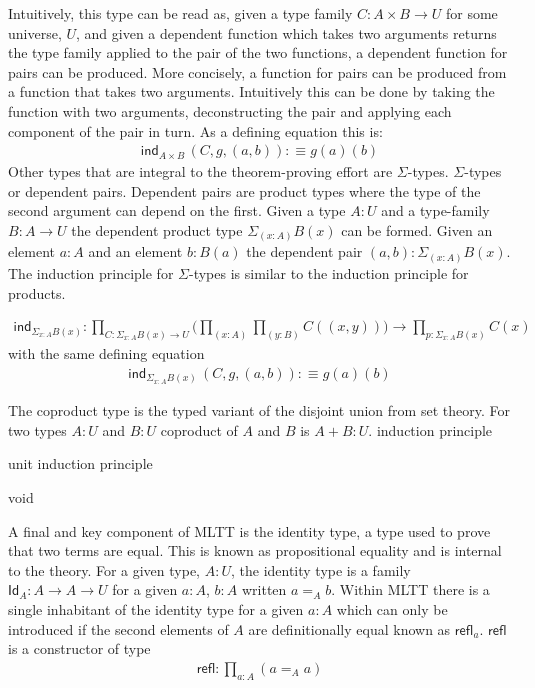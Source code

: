Intuitively, this type can be read as, given a type family $C : A \times B
\rightarrow U$ for some universe, $U$, and given a dependent function which
takes two arguments returns the type family applied to the pair of the two
functions, a dependent function for pairs can be produced. More concisely, a
function for pairs can be produced from a function that takes two arguments.
Intuitively this can be done by taking the function with two arguments,
deconstructing the pair and applying each component of the pair in turn. As a
defining equation this is:
\begin{align*}
    \textsf{ind}_{A \times B}\, (C, g, (a , b)) :\equiv g(a)(b)
\end{align*}
Other types that are integral to the theorem-proving effort are $\Sigma$-types.
$\Sigma$-types or dependent pairs. Dependent pairs are product types where the
type of the second argument can depend on the first. Given a type $A : U$ and a
type-family $B : A \rightarrow U$ the dependent product type $\Sigma_{(x :
A)}B(x)$ can be formed. Given an element $a : A$ and an element $b : B(a)$ the
dependent pair $(a,b) : \Sigma_{(x : A)}B(x)$. The induction principle for
$\Sigma$-types is similar to the induction principle for products.

\begin{align*}
    \textsf{ind}_{\Sigma_{x :A}B(x)} : \prod_{C : \Sigma_{x : A }B(x)\rightarrow
    U}\bigg(\prod_{(x : A)}\prod_{(y : B)}C((x , y))\bigg) \rightarrow \prod_{p :
    \Sigma_{x : A}B(x)}C(x)
\end{align*}
with the same defining equation
\begin{align*}
    \textsf{ind}_{\Sigma_{x :A}B(x)}\, (C, g, (a , b)) :\equiv g(a)(b)
\end{align*}


The coproduct type is the typed variant of the disjoint union from set theory.
For two types $A : U$ and $B : U$ coproduct of $A$ and $B$ is $A + B : U$.
induction principle

unit
induction principle

void

A final and key component of MLTT is the identity type, a type used to prove
that two terms are equal. This is known as propositional equality and is
internal to the theory. For a given type, $A : U$, the identity type is a family
$\textsf{Id}_{A} : A \rightarrow A \rightarrow U$ for a given $a : A$, $b : A$
written $a =_{A} b$. Within MLTT there is a single inhabitant of the identity
type for a given  $a : A$  which can only be introduced if the second elements
of $A$ are definitionally equal known as $\textsf{refl}_{a}$. $\textsf{refl}$ is
a constructor of type
\begin{align*}
    \textsf{refl} : \prod_{a : A}(a =_{A} a)
\end{align*}

